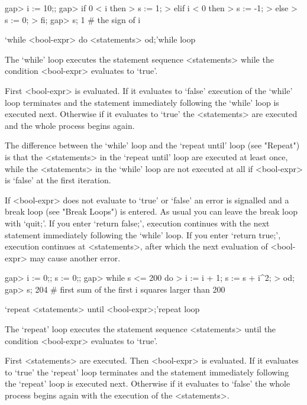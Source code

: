 \beginexample
gap> i := 10;;
gap> if 0 < i then
>    s := 1;
>  elif i < 0 then
>    s := -1;
>  else
>    s := 0;
>  fi;
gap> s;
1    # the sign of i
\endexample



\>`while <bool-expr> do <statements> od;'{while loop}

The `while' loop executes the statement sequence <statements> while the
condition <bool-expr> evaluates to `true'.

First <bool-expr> is evaluated. If it evaluates to `false' execution of
the `while' loop terminates and the statement immediately following the
`while' loop is executed next. Otherwise if it evaluates to `true' the
<statements> are executed and the whole process begins again.

The difference between the `while'  loop and the `repeat until' loop
(see "Repeat") is that the <statements> in the `repeat until' loop are
executed at least once, while the <statements> in the `while' loop are
not executed at all if <bool-expr> is `false' at the first iteration.

If <bool-expr> does not evaluate to `true' or `false' an error is
signalled and a break loop (see "Break Loops") is entered. As usual you
can leave the break loop with `quit;'.  If you enter `return false;',
execution continues with the next statement immediately following the
`while' loop.  If you enter `return true;', execution continues at
<statements>, after which the next evaluation of <bool-expr> may cause
another error.

\beginexample
gap> i := 0;; s := 0;;
gap> while s <= 200 do
>    i := i + 1; s := s + i^2;
>  od;
gap> s;
204    # first sum of the first i squares larger than 200
\endexample



\>`repeat <statements> until <bool-expr>;'{repeat loop}

The `repeat' loop executes the statement sequence <statements> until the
condition <bool-expr> evaluates to `true'.

First <statements> are executed.  Then <bool-expr> is evaluated. If it
evaluates  to `true' the `repeat'  loop terminates and the statement
immediately following the `repeat' loop is executed next. Otherwise if
it evaluates to `false' the whole process begins again with the execution
of the <statements>.

